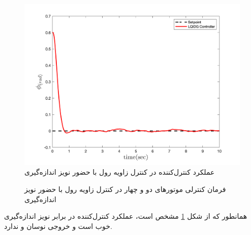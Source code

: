 \begin{figure}[H]
	\includegraphics[width=.48\linewidth]{../Figures/MIL/LQIDG/Roll/lqidg_roll.png}
	\centering
	\caption{عملكرد کنترل‌کننده   در کنترل زاويه رول با حضور نويز اندازه‌گیری}
	\label{lqidg_roll_fig_simulation_n}
\end{figure}
\begin{figure}[H]
	\centering
	\caption{‫‪فرمان کنترلی موتورهای دو و چهار در کنترل زاویه رول با حضور نويز اندازه‌گیری}
\end{figure}
همانطور که از شکل
\ref{lqidg_roll_fig_simulation_n}
مشخص است، عملکرد کنترل‌کننده  در برابر نویز اندازه‌گیری خوب است و خروجی نوسان و ندارد.